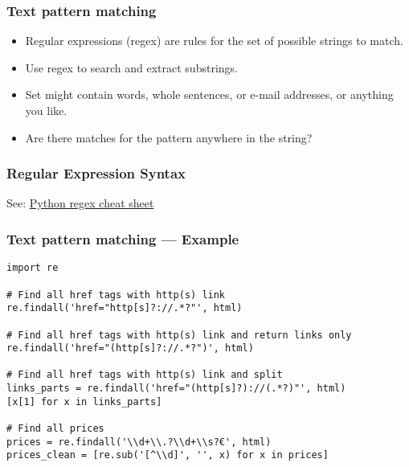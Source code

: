 
\begin{frame}
    \frametitle{Text pattern matching}
    \begin{itemize}
        \item Regular expressions (regex) are rules for the set of
        possible strings to match.
        \item Use regex to search and extract substrings.
        \item Set might contain words, whole sentences, or e-mail
        addresses, or anything you like.
        \item Are there matches for the pattern anywhere in the string?
    \end{itemize}
\end{frame}

\begin{frame}
    \frametitle{Regular Expression Syntax}

    See: \href{https://www.dataquest.io/wp-content/uploads/2019/03/python-regular-expressions-cheat-sheet.pdf}{Python regex cheat sheet}
\end{frame}

\begin{frame}
    \frametitle{Text pattern matching --- Example}
\begin{verbatim}
import re

# Find all href tags with http(s) link
re.findall('href="http[s]?://.*?"', html)

# Find all href tags with http(s) link and return links only
re.findall('href="(http[s]?://.*?")', html)

# Find all href tags with http(s) link and split
links_parts = re.findall('href="(http[s]?)://(.*?)"', html)
[x[1] for x in links_parts]

# Find all prices
prices = re.findall('\\d+\\.?\\d+\\s?€', html)
prices_clean = [re.sub('[^\\d]', '', x) for x in prices]
\end{verbatim}
\end{frame}